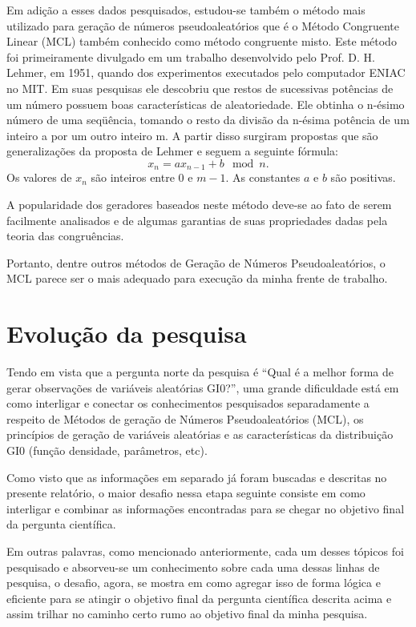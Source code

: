 Em adição a esses dados pesquisados, estudou-se também o método mais utilizado para geração de números pseudoaleatórios que é o Método Congruente Linear (MCL) também conhecido como método congruente misto. Este método foi primeiramente divulgado em um trabalho desenvolvido pelo Prof. D. H. Lehmer, em 1951, quando dos
experimentos executados pelo computador ENIAC no MIT.
Em suas pesquisas ele descobriu que restos de sucessivas potências de um número possuem
boas características de aleatoriedade. Ele obtinha o n-ésimo número de uma seqüência,
tomando o resto da divisão da n-ésima potência de um inteiro a por um outro inteiro m. 
A partir disso surgiram propostas que são generalizações da proposta de Lehmer e seguem a seguinte fórmula:
\begin{equation}
	x_{n} = ax_{n-1} + b \mod n.
\end{equation}
Os valores de $ x_{n} $ são inteiros entre $0$ e $m-1$. 
As constantes $a$ e $b$ são positivas.

A popularidade dos geradores baseados neste método deve-se ao fato de serem facilmente
analisados e de algumas garantias de suas propriedades dadas pela teoria das congruências.

Portanto, dentre outros métodos de Geração de Números Pseudoaleatórios, o MCL parece ser o mais adequado para execução da minha frente de trabalho.

\newpage
\section{Evolução da pesquisa}

Tendo em vista que a pergunta norte da pesquisa é “Qual é a melhor forma de gerar observações de variáveis aleatórias GI0?”, uma grande dificuldade está em como interligar e conectar os conhecimentos pesquisados separadamente a respeito de Métodos de geração de Números Pseudoaleatórios (MCL), os princípios de geração de variáveis aleatórias e as características da distribuição GI0 (função densidade, parâmetros, etc).

Como visto que as informações em separado já foram buscadas e descritas no presente relatório, o maior desafio nessa etapa seguinte consiste em como interligar e combinar as informações encontradas para se chegar no objetivo final da pergunta científica.

Em outras palavras, como mencionado anteriormente, cada um desses tópicos foi pesquisado e absorveu-se um conhecimento sobre cada uma dessas linhas de pesquisa, o desafio, agora, se mostra em como agregar isso de forma lógica e eficiente para se atingir o objetivo final da pergunta científica descrita acima e assim trilhar no caminho certo rumo ao objetivo final da minha pesquisa.



